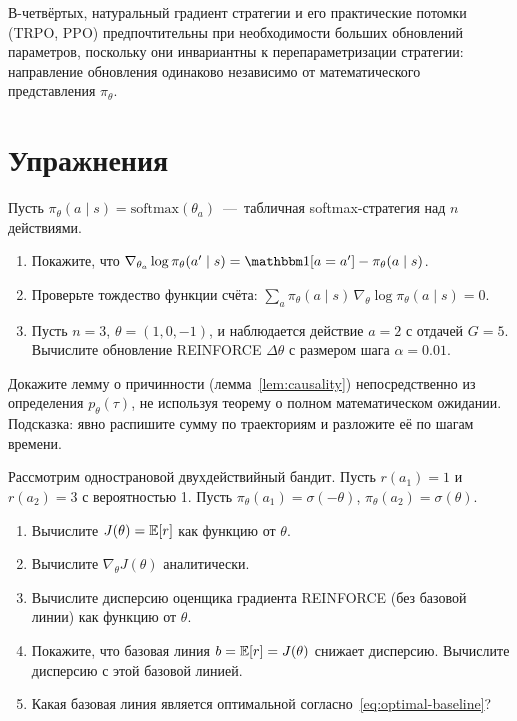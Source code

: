 В-четвёртых, натуральный градиент стратегии и его практические потомки (TRPO, PPO) предпочтительны при необходимости больших обновлений параметров, поскольку они инвариантны к перепараметризации стратегии: направление обновления одинаково независимо от математического представления $\pi_\theta$.

\section*{Упражнения}

\begin{exercise}
\label{ex:pg-score}
Пусть $\pi_\theta(a \mid s) = \mathrm{softmax}(\theta_a)$ \,---\, табличная softmax-стратегия над $n$ действиями.
\begin{enumerate}
\item Покажите, что $\nabla_{\theta_a} \log \pi_\theta(a' \mid s) = \ind[a = a'] - \pi_\theta(a \mid s)$.
\item Проверьте тождество функции счёта: $\sum_{a} \pi_\theta(a \mid s)\, \nabla_\theta \log \pi_\theta(a \mid s) = 0$.
\item Пусть $n = 3$, $\theta = (1, 0, -1)$, и наблюдается действие $a = 2$ с отдачей $G = 5$. Вычислите обновление REINFORCE $\Delta\theta$ с размером шага $\alpha = 0.01$.
\end{enumerate}
\end{exercise}

\begin{exercise}
\label{ex:pg-causality}
Докажите лемму о причинности (лемма~\ref{lem:causality}) непосредственно из определения $p_\theta(\tau)$, не используя теорему о полном математическом ожидании. Подсказка: явно распишите сумму по траекториям и разложите её по шагам времени.
\end{exercise}

\begin{exercise}
\label{ex:pg-baseline-variance}
Рассмотрим однострановой двухдействийный бандит. Пусть $r(a_1) = 1$ и $r(a_2) = 3$ с вероятностью 1. Пусть $\pi_\theta(a_1) = \sigma(-\theta)$, $\pi_\theta(a_2) = \sigma(\theta)$.
\begin{enumerate}
\item Вычислите $J(\theta) = \operatorname{\mathbb{E}}[r]$ как функцию от $\theta$.
\item Вычислите $\nabla_\theta J(\theta)$ аналитически.
\item Вычислите дисперсию оценщика градиента REINFORCE (без базовой линии) как функцию от $\theta$.
\item Покажите, что базовая линия $b = \operatorname{\mathbb{E}}[r] = J(\theta)$ снижает дисперсию. Вычислите дисперсию с этой базовой линией.
\item Какая базовая линия является оптимальной согласно~\eqref{eq:optimal-baseline}?
\end{enumerate}
\end{exercise}


